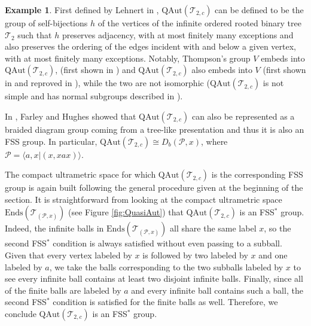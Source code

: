 \documentclass[12pt]{amsart}
\numberwithin{equation}{subsection}
\theoremstyle{definition}
\theoremstyle{definition}
\newtheorem{example}[theorem]{Example}
\theoremstyle{remark}
\begin{document}
\begin{example}\label{ex:quasiauto}
    First defined by Lehnert in \cite{lehnert2008gruppen}, $\text{QAut}(\mathcal T_{2,c})$ can be defined to be the group of self-bijections $h$ of the vertices of the infinite ordered rooted binary tree $\mathcal T_2$ such that $h$ preserves adjacency, with at most finitely many exceptions and also preserves the ordering of the edges incident with and below a given vertex, with at most finitely many exceptions. Notably, Thompson's group $V$ embeds into $\text{QAut}(\mathcal T_{2,c})$, (first shown in \cite{lehnert2008gruppen}) and $\text{QAut}(\mathcal T_{2,c})$ also embeds into $V$ (first shown in \cite{BleakMatucci2016} and reproved in \cite{hughes2017braided}), while the two are not isomorphic ($\text{QAut}(\mathcal T_{2,c})$ is not simple and has normal subgroups described in \cite{Nucinkis2018}). 

    In \cite{hughes2017braided}, Farley and Hughes showed that $\text{QAut}(\mathcal T_{2,c})$ can also be represented as a braided diagram group coming from a tree-like presentation and thus it is also an FSS group. In particular, $\text{QAut}(\mathcal T_{2,c}) \cong D_b(\mathcal P, x)$, where $\mathcal P = \langle a, x \vert (x,xax)\rangle$. 

    The compact ultrametric space for which $\text{QAut}(\mathcal T_{2,c})$ is the corresponding FSS group is again built following the general procedure given at the beginning of the section. It is straightforward from looking at the compact ultrametric space $\text{Ends}(\mathcal T_{(\mathcal P, x)})$ (see Figure \ref{fig:QuasiAut}) that $\text{QAut}(\mathcal T_{2,c})$ is an FSS$^*$ group. Indeed, the infinite balls in $\text{Ends}(\mathcal T_{(\mathcal P, x)})$ all share the same label $x$, so the second FSS$^*$ condition is always satisfied without even passing to a subball. Given that every vertex labeled by $x$ is followed by two labeled by $x$ and one labeled by $a$, we take the balls corresponding to the two subballs labeled by $x$ to see every infinite ball contains at least two disjoint infinite balls. Finally, since all of the finite balls are labeled by $a$ and every infinite ball contains such a ball, the second FSS$^*$ condition is satisfied for the finite balls as well. Therefore, we conclude $\text{QAut}(\mathcal T_{2,c})$ is an FSS$^*$ group.  

    
\end{example}
\end{document}
